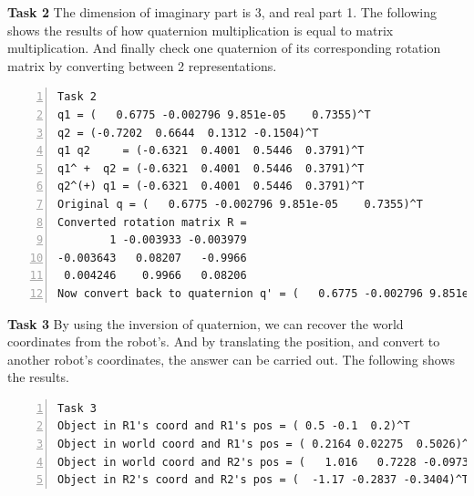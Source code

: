 \documentclass[12pt,a4paper]{article}
\begin{document}
    \textsf{\textbf{Task 2}}
    The dimension of imaginary part is 3, and real part 1.
    The following shows the results of 
    how quaternion multiplication is equal to matrix multiplication.
    And finally check one quaternion of its corresponding rotation matrix
    by converting between 2 representations.
    \begin{lstlisting}[frame=single,numbers=left]
Task 2
q1 = (   0.6775 -0.002796 9.851e-05    0.7355)^T
q2 = (-0.7202  0.6644  0.1312 -0.1504)^T
q1 q2     = (-0.6321  0.4001  0.5446  0.3791)^T
q1^ +  q2 = (-0.6321  0.4001  0.5446  0.3791)^T
q2^(+) q1 = (-0.6321  0.4001  0.5446  0.3791)^T
Original q = (   0.6775 -0.002796 9.851e-05    0.7355)^T
Converted rotation matrix R =
        1 -0.003933 -0.003979
-0.003643   0.08207   -0.9966
 0.004246    0.9966   0.08206
Now convert back to quaternion q' = (   0.6775 -0.002796 9.851e-05    0.7355)^T
    \end{lstlisting}

    \textsf{\textbf{Task 3}}
    By using the inversion of quaternion, 
    we can recover the world coordinates from the robot's.
    And by translating the position, and convert to another robot's
    coordinates, the answer can be carried out.
    The following shows the results.
    \begin{lstlisting}[frame=single,numbers=left]
Task 3
Object in R1's coord and R1's pos = ( 0.5 -0.1  0.2)^T
Object in world coord and R1's pos = ( 0.2164 0.02275  0.5026)^T
Object in world coord and R2's pos = (   1.016   0.7228 -0.09735)^T
Object in R2's coord and R2's pos = (  -1.17 -0.2837 -0.3404)^T
    \end{lstlisting}

    
\end{document}

